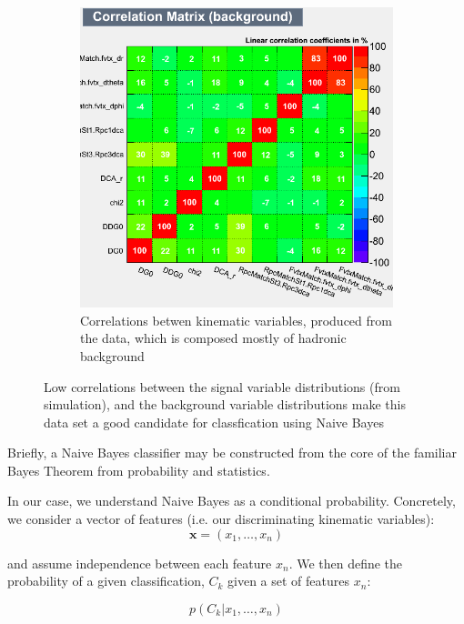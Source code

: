 \begin{figure}[H]
\begin{subfigure}[t]{0.5\textwidth}
		\includegraphics[width=0.95\linewidth]{./figures/CorrelationMatrix_Background.png}
		\caption{Correlations betwen kinematic variables, produced from the data,
			which is composed mostly of hadronic background}
		\label{fig:corr_mat_bkg}
	\end{subfigure}
	\caption{ Low correlations between the signal variable distributions (from
		simulation), and the background variable distributions make this data set a
		good candidate for classfication using Naive Bayes}
	\label{fig:kinematic_var_correlations}
\end{figure}

Briefly, a Naive Bayes classifier may be constructed from the core of the
familiar Bayes Theorem from probability and statistics.

In our case, we understand Naive Bayes as a conditional probability. Concretely,
we consider a vector of features (i.e. our discriminating kinematic variables):
\begin{equation}
	\label{eq:feature_vector}
\mathbf{x} = (x_1, \dots, x_n)
\end{equation}

and assume independence between each feature $x_n$. We then define the
probability of a given classification, $C_k$ given a set of features $x_n$:

\begin{equation}
	\label{eq:cond_probabilty}
p(C_k \vert x_1, \dots, x_n)
\end{equation}

